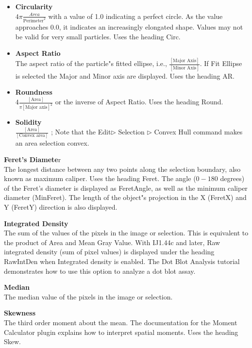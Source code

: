 \begin{itemize}
\item \textbf{Circularity}\\$4\pi\frac{Area}{\text{Perimeter}^{2}}$ with
a value of 1.0 indicating a perfect circle. As the value approaches
0.0, it indicates an increasingly elongated shape. Values may not be
valid for very small particles. Uses the heading Circ.

\item \textbf{Aspect Ratio}\\The aspect ratio of the
particle"s fitted ellipse, i.e., $\frac{[\text{Major Axis}]}{[\text{Minor
Axis}]}$. If Fit Ellipse is selected the Major and Minor axis are
displayed. Uses the heading AR.

\item \textbf{Roundness}\\$4\frac{[\text{Area}]}{\pi [\text{Major axis}]^{2}}$ or the inverse
of Aspect Ratio. Uses the heading Round.
\item \textbf{Solidity}\\$\frac{[\text{Area}]}{[\text{Convex area}]}$ ; 
Note that the 
Edit${\triangleright}$ Selection ${\triangleright}$ Convex Hull 
command makes an area selection convex.

\end{itemize}

\textbf{Feret's Diamete}r\\The longest distance
between any two points along the selection boundary, also known as
maximum caliper. Uses the heading Feret. The angle ($0-180$ degrees)
of the Feret's diameter is displayed as FeretAngle, as
well as the minimum caliper diameter (MinFeret). The length of the
object"s projection in the X (FeretX) and Y (FeretY)
direction is also displayed.

\textbf{Integrated Density}\\The sum of the values of the pixels in
the image or selection. This is equivalent to the product of Area and
Mean Gray Value. With IJ1.44c and later, Raw integrated
density (sum of pixel values) is displayed under the heading RawIntDen
when Integrated density is enabled. The Dot Blot Analysis tutorial
demonstrates how to use this option to analyze a dot blot assay.

\textbf{Median}\\The median value of the pixels in the image or
selection.

\textbf{Skewness}\\The third order moment about the mean. The
documentation for the Moment Calculator plugin explains how to
interpret spatial moments. Uses the heading Skew.

